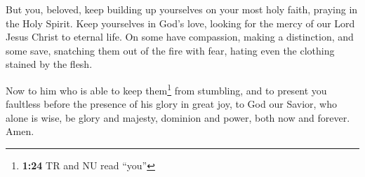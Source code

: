  But you, beloved, keep building up yourselves on your
most holy faith, praying in the Holy Spirit.  Keep
yourselves in God's love, looking for the mercy of our Lord Jesus Christ
to eternal life.  On some have compassion, making a
distinction,  and some save, snatching them out of the
fire with fear, hating even the clothing stained by the flesh.

 Now to him who is able to keep them\footnote{\textbf{1:24}
  TR and NU read ``you''} from stumbling, and to present you faultless
before the presence of his glory in great joy,  to God
our Savior, who alone is wise, be glory and majesty, dominion and power,
both now and forever. Amen.
